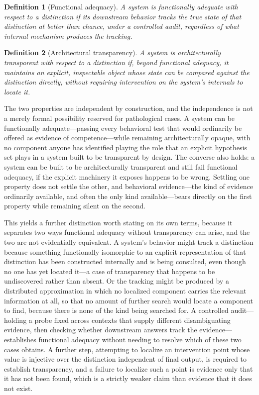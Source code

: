 \documentclass[11pt]{article}
\theoremstyle{plain}
\newtheorem{definition}{Definition}
\begin{document}
\begin{definition}[Functional adequacy]
A system is functionally adequate with respect to a distinction if its downstream behavior tracks the true state of that distinction at better than chance, under a controlled audit, regardless of what internal mechanism produces the tracking.
\end{definition}

\begin{definition}[Architectural transparency]
A system is architecturally transparent with respect to a distinction if, beyond functional adequacy, it maintains an explicit, inspectable object whose state can be compared against the distinction directly, without requiring intervention on the system's internals to locate it.
\end{definition}

The two properties are independent by construction, and the independence is not a merely formal possibility reserved for pathological cases. A system can be functionally adequate---passing every behavioral test that would ordinarily be offered as evidence of competence---while remaining architecturally opaque, with no component anyone has identified playing the role that an explicit hypothesis set plays in a system built to be transparent by design. The converse also holds: a system can be built to be architecturally transparent and still fail functional adequacy, if the explicit machinery it exposes happens to be wrong. Settling one property does not settle the other, and behavioral evidence---the kind of evidence ordinarily available, and often the only kind available---bears directly on the first property while remaining silent on the second.

This yields a further distinction worth stating on its own terms, because it separates two ways functional adequacy without transparency can arise, and the two are not evidentially equivalent. A system's behavior might track a distinction because something functionally isomorphic to an explicit representation of that distinction has been constructed internally and is being consulted, even though no one has yet located it---a case of transparency that happens to be undiscovered rather than absent. Or the tracking might be produced by a distributed approximation in which no localized component carries the relevant information at all, so that no amount of further search would locate a component to find, because there is none of the kind being searched for. A controlled audit---holding a probe fixed across contexts that supply different disambiguating evidence, then checking whether downstream answers track the evidence---establishes functional adequacy without needing to resolve which of these two cases obtains. A further step, attempting to localize an intervention point whose value is injective over the distinction independent of final output, is required to establish transparency, and a failure to localize such a point is evidence only that it has not been found, which is a strictly weaker claim than evidence that it does not exist.
\end{document}
